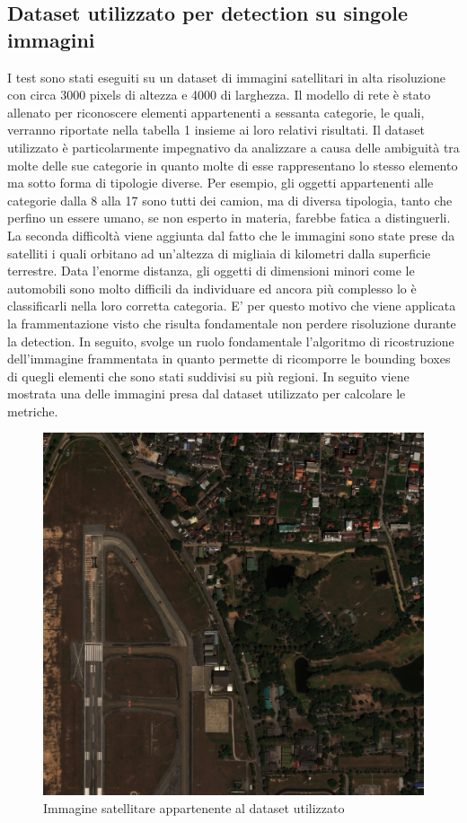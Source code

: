 \subsection{Dataset utilizzato per detection su singole immagini}
I test sono stati eseguiti su un dataset di immagini satellitari in alta risoluzione con circa 3000 pixels di altezza e 4000 di larghezza. Il modello di rete è stato allenato per riconoscere elementi appartenenti a sessanta categorie, le quali, verranno riportate nella tabella 1 insieme ai loro relativi risultati. Il dataset utilizzato è particolarmente impegnativo da analizzare a causa delle ambiguità tra molte delle sue categorie in quanto molte di esse rappresentano lo stesso elemento ma sotto forma di tipologie diverse. Per esempio, gli oggetti appartenenti alle categorie dalla 8 alla 17 sono tutti dei camion, ma di diversa tipologia, tanto che perfino un essere umano, se non esperto in materia, farebbe fatica a distinguerli. La seconda difficoltà viene aggiunta dal fatto che le immagini sono state prese da satelliti i quali orbitano ad un'altezza di migliaia di kilometri dalla superficie terrestre. Data l'enorme distanza, gli oggetti di dimensioni minori come le automobili sono molto difficili da individuare ed ancora più complesso lo è classificarli nella loro corretta categoria. E' per questo motivo che viene applicata la frammentazione visto che risulta fondamentale non perdere risoluzione durante la detection. In seguito, svolge un ruolo fondamentale l'algoritmo di ricostruzione dell'immagine frammentata in quanto permette di ricomporre le bounding boxes di quegli elementi che sono stati suddivisi su più regioni. In seguito viene mostrata una delle immagini presa dal dataset utilizzato per calcolare le metriche.
\begin{figure}[H]
	\centering
	\includegraphics[width=0.7\linewidth]{images/immagine-satellite.jpg}
	\caption{Immagine satellitare appartenente al dataset utilizzato}
	\label{Immagine satellitare appartenente al dataset utilizzato}
\end{figure}

